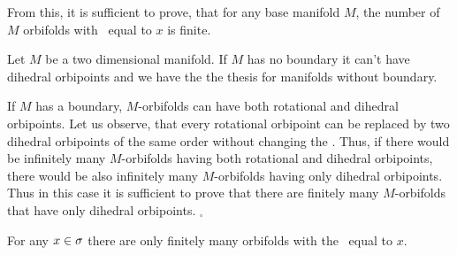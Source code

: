 From this, it is sufficient to prove, that for any base manifold $M$, 
the number of $M$ orbifolds 
with \Eoc\ equal to $x$ is finite.

Let $M$ be a two dimensional manifold. 
If $M$ has no boundary it can't have dihedral orbipoints and we have the the thesis for manifolds 
without boundary.

If $M$ has a boundary, $M$-orbifolds 
can have both rotational and dihedral orbipoints. 
Let us observe, that every rotational orbipoint can be replaced by two dihedral orbipoints 
of the same order without changing the \Eoc. Thus, if there would be infinitely many 
$M$-orbifolds having both rotational and dihedral orbipoints, there would be 
also infinitely many $M$-orbifolds having only dihedral orbipoints. 
Thus in this case it is sufficient to prove that there are finitely many $M$-orbifolds 
that have only dihedral orbipoints. $_\square$



\begin{theorem}\label{second_finiteness_theorem}
For any $x \in {\sigma}$ there are only finitely many orbifolds 
with the \Eoc\ equal to $x$.
\end{theorem}


